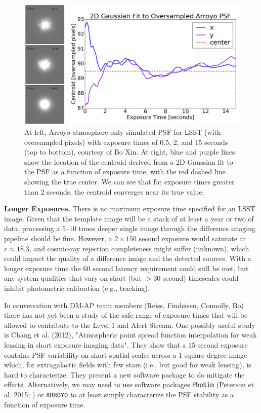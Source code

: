 \documentclass[DM,lsstdraft,toc]{lsstdoc}
\begin{document}
\begin{figure}
\begin{center}
\includegraphics[width=14cm,trim={0cm 0cm 0cm 0cm}, clip]{figures/exptime.png}
\caption{At left, Arroyo atmosphere-only simulated PSF for LSST (with oversampled pixels) with exposure times of 0.5, 2, and 15 seconds (top to bottom), courtesy of Bo Xin. At right, blue and purple lines show the location of the centroid derived from a 2D Gaussian fit to the PSF as a function of exposure time, with the red dashed line showing the true center. We can see that for exposure times greater than 2 seconds, the centroid converges near its true value. \label{fig:expt}}
\end{center}
\end{figure}

\textbf{Longer Exposures.} There is no maximum exposure time specified for an LSST image. Given that the template image will be a stack of at least a year or two of data, processing a $5$--$10$ times deeper single image through the difference imaging pipeline should be fine. However, a $2\times150$ second exposure would saturate at $r \approx 18.3$, and cosmic-ray rejection completeness might suffer (unknown), which could impact the quality of a difference image and the detected sources. With a longer exposure time the $60$ second latency requirement could still be met, but any system qualities that vary on short (but $>30$ second) timescales could inhibit photometric calibration (e.g., tracking).

In conversation with DM-AP team members (Reiss, Findeisen, Connolly, Bo) there has not yet been a study of the safe range of exposure times that will be allowed to contribute to the Level 1 and Alert Stream. One possibly useful study is Chang et al. (2012), "Atmospheric point spread function interpolation for weak lensing in short exposure imaging data". They show that a 15 second exposure contains PSF variability on short spatial scales across a 1 square degree image which, for extragalactic fields with few stars (i.e., but good for weak lensing), is hard to characterize. They present a new software package to do mitigate the effects. Alternatively, we may need to use software packages \texttt{PhoSim} (Peterson et al. 2015; \citep{2015ApJS..218...14P}) or \texttt{ARROYO} \citep{2004SPIE.5497..290B} to at least simply characterize the PSF stability as a function of exposure time.
\end{document}
